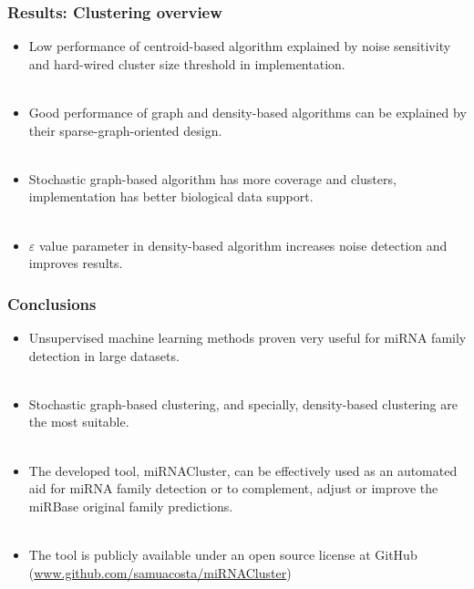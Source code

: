 \documentclass{beamer}
\begin{document}
\begin{frame}
\frametitle{Results: Clustering overview}
\begin{itemize}
\item Low performance of centroid-based algorithm explained by noise sensitivity and hard-wired cluster size threshold in implementation.\\~\\
\item Good performance of graph and density-based algorithms can be explained by their sparse-graph-oriented design.\\~\\
\item Stochastic graph-based algorithm has more coverage and clusters, implementation has better biological data support.\\~\\
\item $\varepsilon$ value parameter in density-based algorithm increases noise detection and improves results.
\end{itemize}
\end{frame}

\begin{frame}
\frametitle{Conclusions}
\begin{itemize}
\item Unsupervised machine learning methods proven very useful for miRNA family detection in large datasets.\\~\\
\item Stochastic graph-based clustering, and specially, density-based clustering are the most suitable.\\~\\
\item The developed tool, miRNACluster, can be effectively used as an automated aid for miRNA family detection or to complement, adjust or improve the miRBase original family predictions.\\~\\
\item The tool is publicly available under an open source license at GitHub (\href{http://www.github.com/samuacosta/miRNACluster}{www.github.com/samuacosta/miRNACluster})
\end{itemize}
\end{frame}
\end{document}
